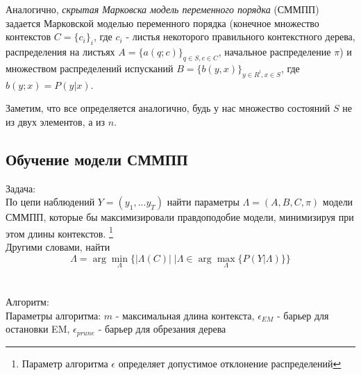\documentclass{matmex-diploma-custom}
\begin{document}
Аналогично, \textit{скрытая Марковска модель переменного порядка} (СММПП) задается Марковской моделью переменного порядка (конечное множество контекстов $ C=\{c_{i}\}_{i} $, где $ c_{i} $ - листья некоторого правильного контекстного дерева, распределения на листьях $ A = \{a(q; c)\}_{q \in S, c \in C}$, начальное распределение $ \pi $)  и множеством распределений испусканий $ B = \{b(y,x)\}_{y \in R^{l}, x \in S}$, где $ b(y; x) = P(y|x)$. 

Заметим, что все определяется аналогично, будь у нас множество состояний $ S $ не из двух элементов, а из $n$.
\subsection{Обучение модели СММПП}
{\large Задача:} 
\\
По цепи наблюдений $ Y = (y_{1}, ... y_{T}) $ найти параметры $\Lambda = (A,B,C,\pi)$ модели СММПП, которые бы максимизировали правдоподобие модели, минимизируя при этом длины контекстов. 
\footnote{Параметр алгоритма $ \epsilon $ определяет допустимое отклонение распределений}
\\
Другими словами, найти
\\
$$\Lambda = \arg\!\min_{\Lambda}{\{|\Lambda(C)|\;|\Lambda \in \arg\!\max_{\Lambda}{\{P(Y|\Lambda)\}}\}}$$
\\\\
{\large Алгоритм:}
\\
Параметры алгоритма: 
$ m $ - максимальная длина контекста, 
$ \epsilon_{EM} $ - барьер для остановки EM,
$ \epsilon_{prune} $ - барьер для обрезания дерева
\\
\end{document}
